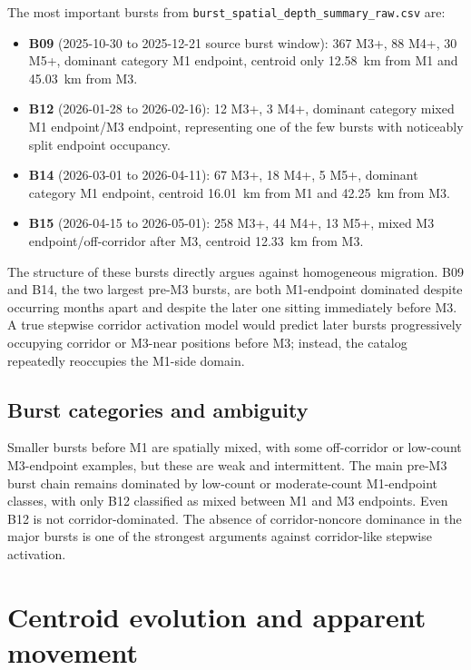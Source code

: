 \documentclass[11pt]{article}
\begin{document}
The most important bursts from \texttt{burst\_spatial\_depth\_summary\_raw.csv} are:
\begin{itemize}[leftmargin=1.5em]
    \item \textbf{B09} (2025-10-30 to 2025-12-21 source burst window): 367 M3+, 88 M4+, 30 M5+, dominant category M1 endpoint, centroid only \SI{12.58}{km} from M1 and \SI{45.03}{km} from M3.
    \item \textbf{B12} (2026-01-28 to 2026-02-16): 12 M3+, 3 M4+, dominant category mixed M1 endpoint/M3 endpoint, representing one of the few bursts with noticeably split endpoint occupancy.
    \item \textbf{B14} (2026-03-01 to 2026-04-11): 67 M3+, 18 M4+, 5 M5+, dominant category M1 endpoint, centroid \SI{16.01}{km} from M1 and \SI{42.25}{km} from M3.
    \item \textbf{B15} (2026-04-15 to 2026-05-01): 258 M3+, 44 M4+, 13 M5+, mixed M3 endpoint/off-corridor after M3, centroid \SI{12.33}{km} from M3.
\end{itemize}

The structure of these bursts directly argues against homogeneous migration. B09 and B14, the two largest pre-M3 bursts, are both M1-endpoint dominated despite occurring months apart and despite the later one sitting immediately before M3. A true stepwise corridor activation model would predict later bursts progressively occupying corridor or M3-near positions before M3; instead, the catalog repeatedly reoccupies the M1-side domain.

\subsection{Burst categories and ambiguity}
Smaller bursts before M1 are spatially mixed, with some off-corridor or low-count M3-endpoint examples, but these are weak and intermittent. The main pre-M3 burst chain remains dominated by low-count or moderate-count M1-endpoint classes, with only B12 classified as mixed between M1 and M3 endpoints. Even B12 is not corridor-dominated. The absence of corridor-noncore dominance in the major bursts is one of the strongest arguments against corridor-like stepwise activation.

\section{Centroid evolution and apparent movement}
\end{document}
